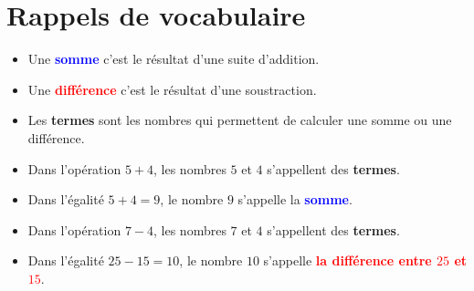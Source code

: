 \section{Rappels de vocabulaire} %
\begin{vocabulaire}
   \begin{itemize}
      \item Une \textcolor{blue}{\textbf{somme}} c'est le résultat d'une suite d'addition.
      \item Une \textcolor{red}{\textbf{différence}} c'est le résultat d'une soustraction.
      \item Les \textbf{termes} sont les nombres qui permettent de calculer une somme ou une différence.
      \end{itemize}
\end{vocabulaire}

\begin{exemples*1}
   \begin{itemize}
      \item Dans l'opération \og{}$5+4$\fg{}, les nombres $5$ et $4$ s'appellent des \textbf{termes}.%
      \item Dans l'égalité \og{}$5+4=9$\fg{}, le nombre $9$ s'appelle la \textcolor{blue}{\textbf{somme}}.%
      \item Dans l'opération \og{}$7-4$\og{}, les nombres $7$ et $4$ s'appellent des \textbf{termes}.%
      \item Dans l'égalité \og{}$25-15=10$\fg{}, le nombre $10$ s'appelle \textcolor{red}{\textbf{la différence entre $25$ et $15$}}.%
   \end{itemize}
\end{exemples*1}

